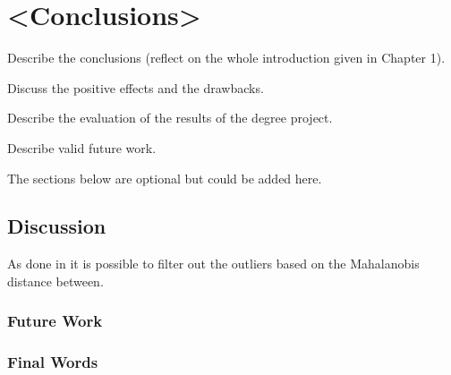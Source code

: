 \chapter{<Conclusions>}
Describe the conclusions (reflect on the whole introduction given in Chapter 1). 

Discuss the positive effects and the drawbacks. 

Describe the evaluation of the results of the degree project.

Describe valid future work.  

The sections below are optional but could be added here.

\section{Discussion}
As done in \cite{aldera_what_2019} it is possible to filter out the outliers based on the Mahalanobis distance between.
\subsection{Future Work}

\subsection{Final Words}







